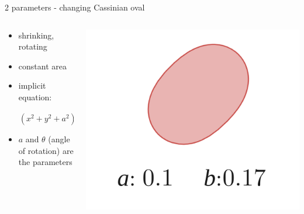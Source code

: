 \documentclass[aspectratio=169,xcolor=dvipsnames]{beamer}
\begin{document}
\begin{frame}{2 parameters - changing Cassinian oval}
	\begin{columns}
		\begin{column}{.6\textwidth}
			\begin{itemize}
				\setlength\itemsep{1.4em}
				\item shrinking, rotating
				\item constant area
				\item implicit equation:
			\end{itemize}		
			\vspace{4mm}
			$$ \ \ \ \ \ \ \ \ \left( x^{2}+ y^{2}+a^{2} \right)^{2}-4 x ^{2} a^{2}-b^{4} = 0 $$
			\vspace{-3mm}
			\begin{itemize}
				\item $ a $ and $ \theta $ (angle of rotation) are the parameters
			\end{itemize}	
		\end{column}
		\begin{column}{.4\textwidth}
			\includegraphics[width=0.9\linewidth, trim={0 0 0 0}, clip]{Images/a1.png}			
		\end{column}
	\end{columns}	
\end{frame}
\end{document}
